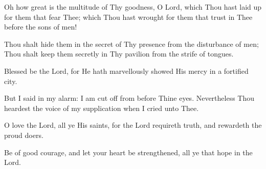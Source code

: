 Oh how great is the multitude of Thy goodness, O Lord, which Thou hast laid up for them that fear Thee; which Thou hast wrought for them that trust in Thee before the sons of men!

Thou shalt hide them in the secret of Thy presence from the disturbance of men; Thou shalt keep them secretly in Thy pavilion from the strife of tongues.

Blessed be the Lord, for He hath marvellously showed His mercy in a fortified city.

But I said in my alarm: I am cut off from before Thine eyes. Nevertheless Thou heardest the voice of my supplication when I cried unto Thee.

O love the Lord, all ye His saints, for the Lord requireth truth, and rewardeth the proud doers.

Be of good courage, and let your heart be strengthened, all ye that hope in the Lord.
